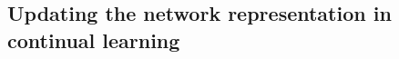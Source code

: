\documentclass{article} %
\makeatletter
\newcommand{\ie}{\textit{i.e.\@}\xspace}
\newcommand{\mbf}[1]{\mathbf{#1}}
\newcommand{\MB}{\mbf{B}}
\newcommand{\MI}{\mbf{I}}
\makeatother
\begin{document}
\subsection{Updating the network representation in continual learning}
\label{sec:cl-exp}
%
%
%
%
%
\end{document}
